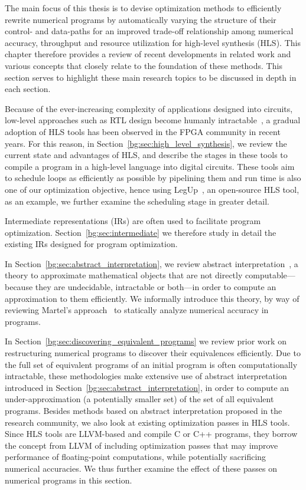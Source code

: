 The main focus of this thesis is to devise optimization methods to efficiently
rewrite numerical programs by automatically varying the structure of their
control- and data-paths for an improved trade-off relationship among numerical
accuracy, throughput and resource utilization for high-level synthesis (HLS).
This chapter therefore provides a review of recent developments in related work
and various concepts that closely relate to the foundation of these methods.
This section serves to highlight these main research topics to be discussed in
depth in each section.

Because of the ever-increasing complexity of applications designed
into circuits, low-level approaches such as RTL design become humanly
intractable~\cite{gajski}, a gradual adoption of HLS tools has been
observed in the FPGA community in recent years.  For this reason, in
Section~\ref{bg:sec:high_level_synthesis}, we review the current state and
advantages of HLS, and describe the stages in these tools to compile a program
in a high-level language into digital circuits.  These tools aim to schedule
loops as efficiently as possible by pipelining them and run time is also one of
our optimization objective, hence using LegUp~\cite{legup}, an open-source HLS
tool, as an example, we further examine the scheduling stage in greater detail.

Intermediate representations (IRs) are often used to facilitate program
optimization.  Section~\ref{bg:sec:intermediate} we therefore study in detail
the existing IRs designed for program optimization.

In Section~\ref{bg:sec:abstract_interpretation}, we review abstract
interpretation~\cite{cousot77}, a theory to approximate mathematical objects
that are not directly computable---because they are undecidable, intractable or
both---in order to compute an approximation to them efficiently.  We informally
introduce this theory, by way of reviewing Martel's approach~\cite{martel07} to
statically analyze numerical accuracy in programs.

In Section~\ref{bg:sec:discovering_equivalent_programs} we review prior work on
restructuring numerical programs to discover their equivalences efficiently.
Due to the full set of equivalent programs of an initial program is often
computationally intractable, these methodologies make extensive use of abstract
interpretation introduced in Section~\ref{bg:sec:abstract_interpretation}, in
order to compute an under-approximation (a potentially smaller set) of the set
of all equivalent programs.  Besides methods based on abstract interpretation
proposed in the research community, we also look at existing optimization
passes in HLS tools.  Since HLS tools are LLVM-based and compile C or C++
programs, they borrow the concept from LLVM of including optimization passes
that may improve performance of floating-point computations, while potentially
sacrificing numerical accuracies.  We thus further examine the effect of these
passes on numerical programs in this section.

